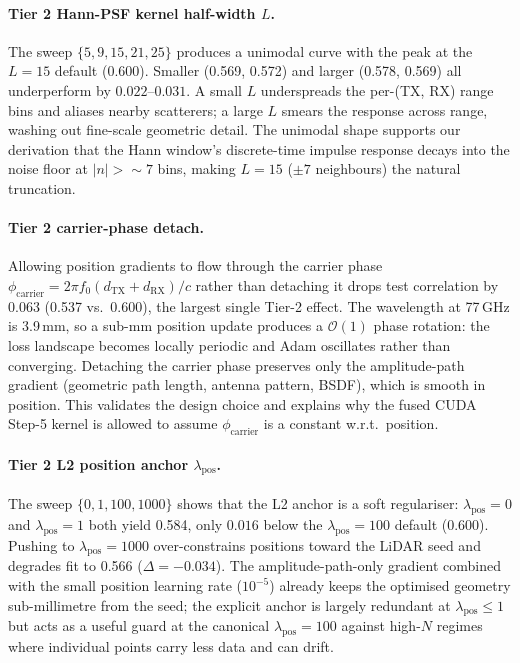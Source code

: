 \paragraph{Tier 2 \textemdash{} Hann-PSF kernel half-width $L$.} The sweep $\{5, 9, 15, 21, 25\}$ produces a unimodal curve with the peak at the $L{=}15$ default (0.600). Smaller (0.569, 0.572) and larger (0.578, 0.569) all underperform by $0.022$--$0.031$. A small $L$ underspreads the per-(TX, RX) range bins and aliases nearby scatterers; a large $L$ smears the response across range, washing out fine-scale geometric detail. The unimodal shape supports our derivation that the Hann window's discrete-time impulse response decays into the noise floor at $|n|{>}\sim 7$ bins, making $L{=}15$ ($\pm 7$ neighbours) the natural truncation.

\paragraph{Tier 2 \textemdash{} carrier-phase detach.} Allowing position gradients to flow through the carrier phase $\phi_{\text{carrier}} = 2\pi f_0 (d_{\text{TX}} + d_{\text{RX}})/c$ rather than detaching it drops test correlation by $0.063$ (0.537 vs.~0.600), the largest single Tier-2 effect. The wavelength at 77\,GHz is 3.9\,mm, so a sub-mm position update produces a $\mathcal{O}(1)$ phase rotation: the loss landscape becomes locally periodic and Adam oscillates rather than converging. Detaching the carrier phase preserves only the amplitude-path gradient (geometric path length, antenna pattern, BSDF), which is smooth in position. This validates the design choice and explains why the fused CUDA Step-5 kernel is allowed to assume $\phi_{\text{carrier}}$ is a constant w.r.t.~position.

\paragraph{Tier 2 \textemdash{} L2 position anchor $\lambda_{\mathrm{pos}}$.} The sweep $\{0, 1, 100, 1000\}$ shows that the L2 anchor is a soft regulariser: $\lambda_{\mathrm{pos}} = 0$ and $\lambda_{\mathrm{pos}} = 1$ both yield 0.584, only $0.016$ below the $\lambda_{\mathrm{pos}}{=}100$ default (0.600). Pushing to $\lambda_{\mathrm{pos}} = 1000$ over-constrains positions toward the LiDAR seed and degrades fit to 0.566 ($\Delta{=}-0.034$). The amplitude-path-only gradient combined with the small position learning rate ($10^{-5}$) already keeps the optimised geometry sub-millimetre from the seed; the explicit anchor is largely redundant at $\lambda_{\mathrm{pos}}\!\leq\!1$ but acts as a useful guard at the canonical $\lambda_{\mathrm{pos}}{=}100$ against high-$N$ regimes where individual points carry less data and can drift.

